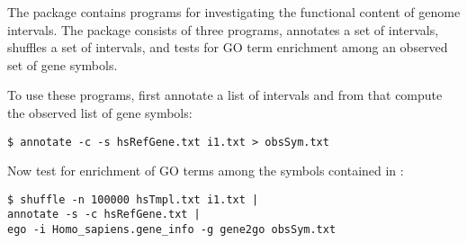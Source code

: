 The package  contains programs for investigating the
functional content of genome intervals. The package consists of three
programs,  annotates a set of intervals, 
shuffles a set of intervals, and  tests for GO term enrichment
among an observed set of gene symbols.

To use these programs, first annotate a list of intervals and from
that compute the observed list of gene symbols:
\begin{verbatim}
$ annotate -c -s hsRefGene.txt i1.txt > obsSym.txt
\end{verbatim}

Now test for enrichment of GO terms among the symbols contained
in :
\begin{verbatim}
$ shuffle -n 100000 hsTmpl.txt i1.txt |
annotate -s -c hsRefGene.txt |
ego -i Homo_sapiens.gene_info -g gene2go obsSym.txt
\end{verbatim}
